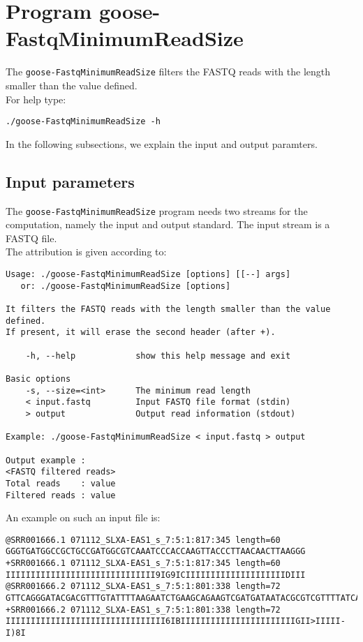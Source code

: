 \section{Program goose-FastqMinimumReadSize}
The \texttt{goose-FastqMinimumReadSize} filters the FASTQ reads with the length smaller than the value defined.\\
For help type:
\begin{lstlisting}
./goose-FastqMinimumReadSize -h
\end{lstlisting}
In the following subsections, we explain the input and output paramters.

\subsection*{Input parameters}

The \texttt{goose-FastqMinimumReadSize} program needs two streams for the computation,
namely the input and output standard. The input stream is a FASTQ file.\\
The attribution is given according to:
\begin{lstlisting}
Usage: ./goose-FastqMinimumReadSize [options] [[--] args]
   or: ./goose-FastqMinimumReadSize [options]

It filters the FASTQ reads with the length smaller than the value defined. 
If present, it will erase the second header (after +).

    -h, --help            show this help message and exit

Basic options
    -s, --size=<int>      The minimum read length
    < input.fastq         Input FASTQ file format (stdin)
    > output              Output read information (stdout)

Example: ./goose-FastqMinimumReadSize < input.fastq > output

Output example :
<FASTQ filtered reads>
Total reads    : value
Filtered reads : value
\end{lstlisting}
An example on such an input file is:
\begin{lstlisting}
@SRR001666.1 071112_SLXA-EAS1_s_7:5:1:817:345 length=60
GGGTGATGGCCGCTGCCGATGGCGTCAAATCCCACCAAGTTACCCTTAACAACTTAAGGG
+SRR001666.1 071112_SLXA-EAS1_s_7:5:1:817:345 length=60
IIIIIIIIIIIIIIIIIIIIIIIIIIIIII9IG9ICIIIIIIIIIIIIIIIIIIIIDIII
@SRR001666.2 071112_SLXA-EAS1_s_7:5:1:801:338 length=72
GTTCAGGGATACGACGTTTGTATTTTAAGAATCTGAAGCAGAAGTCGATGATAATACGCGTCGTTTTATCAT
+SRR001666.2 071112_SLXA-EAS1_s_7:5:1:801:338 length=72
IIIIIIIIIIIIIIIIIIIIIIIIIIIIIIII6IBIIIIIIIIIIIIIIIIIIIIIIIGII>IIIII-I)8I
\end{lstlisting}

